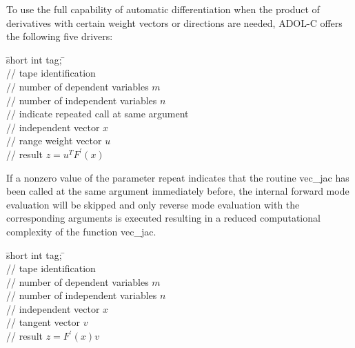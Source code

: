 \documentclass[11pt,twoside]{article}
\begin{document}
To use the full capability of automatic differentiation when the 
product of derivatives with certain weight vectors or directions are needed, ADOL-C offers
the following five drivers:
%
\begin{tabbing}
\hspace{0.5in}\={\sf short int tag;} \hspace{1.1in}\= \kill    %
\\
         \> // tape identification \\
                 \> // number of dependent variables $m$\\ 
                 \> // number of independent variables $n$\\
            \> // indicate repeated call at same argument\\
           \> // independent vector $x$ \\
           \> // range weight vector $u$ \\ 
           \> // result $z = u^TF^\prime (x)$
\end{tabbing}
If a nonzero value of the parameter {\sf repeat} indicates that the
routine {\sf vec\_jac} has been called at the same argument immediately
before, the internal forward mode evaluation will be skipped and only
reverse mode evaluation with the corresponding arguments is executed
resulting in a reduced computational complexity of the function {\sf vec\_jac}.
%
\begin{tabbing}
\hspace{0.5in}\={\sf short int tag;} \hspace{1.1in}\= \kill    %
\\
         \> // tape identification \\
                 \> // number of dependent variables $m$\\
                 \> // number of independent variables $n$\\
           \> // independent vector $x$\\
           \> // tangent vector $v$\\ 
           \> // result $z = F^\prime (x)v$
\end{tabbing}
%
\end{document}
